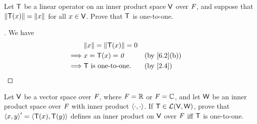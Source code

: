 \setcounter{ex}{16}
\begin{ex}\label{ex:6.1.17}
  Let \(\mathsf{T}\) be a linear operator on an inner product space \(\mathsf{V}\) over \(\mathit{F}\), and suppose that \(\left\lVert\mathsf{T}(x)\right\rVert = \left\lVert x\right\rVert\) for all \(x \in \mathsf{V}\).
  Prove that \(\mathsf{T}\) is one-to-one.
\end{ex}

\begin{proof}[]
  We have
  \begin{align*}
             & \norm{x} = \norm{\T(x)} = 0                  \\
    \implies & x = \T(x) = \zv             &  & \by{6.2}[b] \\
    \implies & \T \text{ is one-to-one}.   &  & \by{2.4}
  \end{align*}
\end{proof}

\begin{ex}\label{ex:6.1.18}
  Let \(\mathsf{V}\) be a vector space over \(\mathit{F}\), where \(\mathit{F} = \mathbb{R}\) or \(\mathit{F} = \mathbb{C}\), and let \(\mathsf{W}\) be an inner product space over \(\mathit{F}\) with inner product \(\left\langle\cdot, \cdot\right\rangle\).
  If \(\mathsf{T} \in \mathcal{L}(\mathsf{V}, \mathsf{W})\), prove that \(\left\langle x, y\right\rangle' = \left\langle\mathsf{T}(x), \mathsf{T}(y)\right\rangle\) defines an inner product on \(\mathsf{V}\) over \(\mathit{F}\) iff \(\mathsf{T}\) is one-to-one.
\end{ex}

